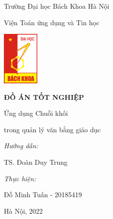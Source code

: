 \begin{titlepage}
    \centering
    \vspace{0.25cm}
    {\large Trường Đại học Bách Khoa Hà Nội\par}
    \vspace{0.25cm}
    {\normalsize Viện Toán ứng dụng và Tin học\par}
    \vspace{0.75cm}
    {\includegraphics[width=69px]{anh/hust-logo.png}\par}
    \vspace{1cm}
    {\Large\textbf{ĐỒ ÁN TỐT NGHIỆP}\par}
    \vspace{1.5cm}
    {\large Ứng dụng Chuỗi khối\par}
    \vspace{0.25cm}
    {\large trong quản lý văn bằng giáo dục\par}
    \vspace{1.25cm}
    \begin{flushleft}
        \hspace{3cm}
        {\normalsize\textit{Hướng dẫn:}\par}
        \vspace{0.125cm}
        \hspace{5cm}
        {\normalsize TS. Đoàn Duy Trung\par}
        \vspace{0.125cm}
        \hspace{3cm}
        {\normalsize\textit{Thực hiện:}\par}
        \vspace{0.125cm}
        \hspace{5cm}
        {\normalsize Đỗ Minh Tuấn - 20185419\par}
    \end{flushleft}
    \vspace{3cm}
    {\normalsize Hà Nội, 2022\par}
    \vspace{0.5cm}
\end{titlepage}